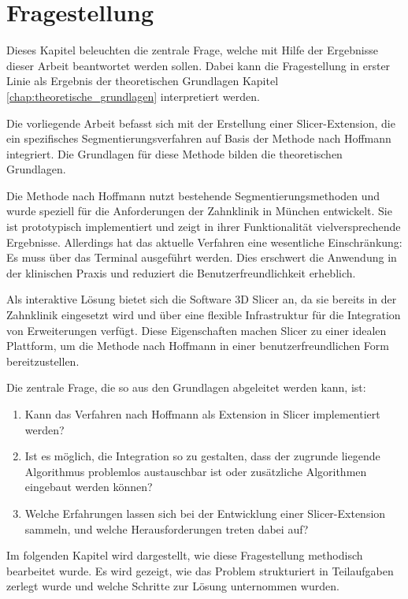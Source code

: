 \chapter{Fragestellung}
\label{chap:fragestellung} Dieses Kapitel beleuchten die zentrale Frage, welche
mit Hilfe der Ergebnisse dieser Arbeit beantwortet werden sollen. Dabei kann die
Fragestellung in erster Linie als Ergebnis der theoretischen Grundlagen Kapitel \ref{chap:theoretische_grundlagen}
interpretiert werden.

Die vorliegende Arbeit befasst sich mit der Erstellung einer Slicer-Extension,
die ein spezifisches Segmentierungsverfahren auf Basis der Methode nach Hoffmann
integriert. Die Grundlagen für diese Methode bilden die theoretischen Grundlagen.

Die Methode nach Hoffmann nutzt bestehende Segmentierungsmethoden und wurde speziell
für die Anforderungen der Zahnklinik in München entwickelt. Sie ist prototypisch
implementiert und zeigt in ihrer Funktionalität vielversprechende Ergebnisse. Allerdings
hat das aktuelle Verfahren eine wesentliche Einschränkung: Es muss über das
Terminal ausgeführt werden. Dies erschwert die Anwendung in der klinischen Praxis
und reduziert die Benutzerfreundlichkeit erheblich.

Als interaktive Lösung bietet sich die Software 3D Slicer an, da sie bereits in
der Zahnklinik eingesetzt wird und über eine flexible Infrastruktur für die
Integration von Erweiterungen verfügt. Diese Eigenschaften machen Slicer zu einer
idealen Plattform, um die Methode nach Hoffmann in einer benutzerfreundlichen
Form bereitzustellen.

Die zentrale Frage, die so aus den Grundlagen abgeleitet werden kann, ist:

\begin{enumerate}
	\item Kann das Verfahren nach Hoffmann als Extension in Slicer implementiert werden?

	\item Ist es möglich, die Integration so zu gestalten, dass der zugrunde liegende
		Algorithmus problemlos austauschbar ist oder zusätzliche Algorithmen eingebaut
		werden können?

	\item Welche Erfahrungen lassen sich bei der Entwicklung einer Slicer-Extension
		sammeln, und welche Herausforderungen treten dabei auf?
\end{enumerate}

Im folgenden Kapitel wird dargestellt, wie diese Fragestellung methodisch
bearbeitet wurde. Es wird gezeigt, wie das Problem strukturiert in Teilaufgaben
zerlegt wurde und welche Schritte zur Lösung unternommen wurden.